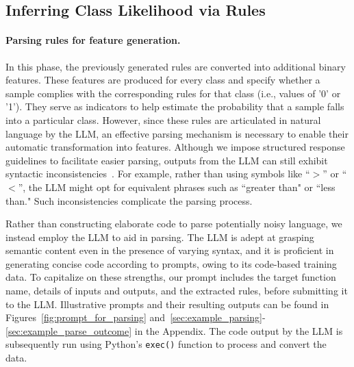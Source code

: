 \subsection{Inferring Class Likelihood via Rules}
\label{Sec:training}

\paragraph{Parsing rules for feature generation.} In this phase, the previously generated rules are converted into additional binary features. These features are produced for every class and specify whether a sample complies with the corresponding rules for that class (i.e., values of '0' or '1'). They serve as indicators to help estimate the probability that a sample falls into a particular class. However, since these rules are articulated in natural language by the LLM, an effective parsing mechanism is necessary to enable their automatic transformation into features. Although we impose structured response guidelines to facilitate easier parsing, outputs from the LLM can still exhibit syntactic inconsistencies~\cite{kovavc2023large}. For example, rather than using symbols like ``$>$” or ``$<$”, the LLM might opt for equivalent phrases such as ``greater than" or ``less than." Such inconsistencies complicate the parsing process.

Rather than constructing elaborate code to parse potentially noisy language, we instead employ the LLM to aid in parsing. The LLM is adept at grasping semantic content even in the presence of varying syntax, and it is proficient in generating concise code according to prompts, owing to its code-based training data. To capitalize on these strengths, our prompt includes the target function name, details of inputs and outputs, and the extracted rules, before submitting it to the LLM. Illustrative prompts and their resulting outputs can be found in Figures~\ref{fig:prompt_for_parsing} and~\ref{sec:example_parsing}-\ref{sec:example_parse_outcome} in the Appendix. The code output by the LLM is subsequently run using Python’s \texttt{exec()} function to process and convert the data.

\vspace*{-0.12in}
